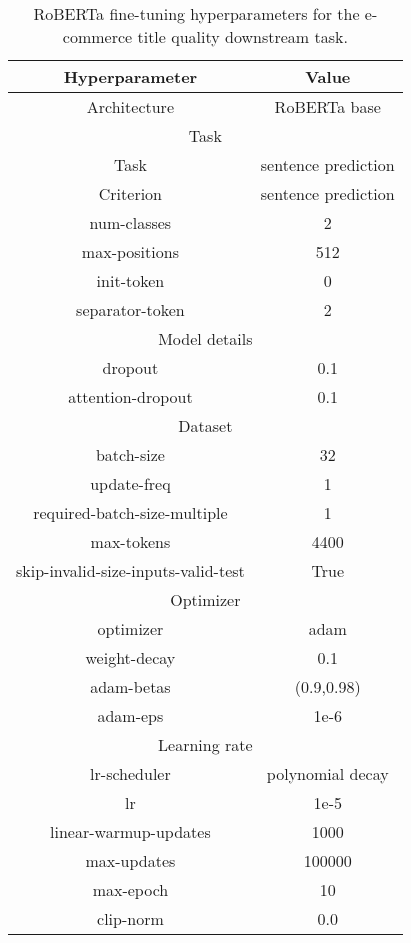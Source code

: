 \begin{table}[!h]
	\caption{RoBERTa fine-tuning hyperparameters for the e-commerce title quality downstream task.}
	\label{tab:roberta_finetune_equality}
	\begin{center}
		\begin{tabular}{|c|c|}
			\hline
			Hyperparameter\cellcolor[gray]{0.6} & Value \cellcolor[gray]{0.6} \\ \hline
Architecture & RoBERTa base \\ \hline 
\multicolumn{2}{|c|}{\cellcolor[gray]{0.9} Task}\\ \hline 
Task& sentence prediction \\ \hline 
Criterion & sentence prediction \\ \hline 
num-classes & 2 \\ \hline 
max-positions & 512 \\ \hline
init-token & 0  \\ \hline 
separator-token & 2  \\ \hline 
\multicolumn{2}{|c|}{\cellcolor[gray]{0.9} Model details}\\ \hline 
dropout & 0.1 \\ \hline 
attention-dropout & 0.1 \\ \hline 
\multicolumn{2}{|c|}{\cellcolor[gray]{0.9} Dataset}\\ \hline 
batch-size & 32 \\ \hline 
update-freq & 1 \\ \hline 
required-batch-size-multiple & 1 \\ \hline
max-tokens & 4400 \\ \hline
skip-invalid-size-inputs-valid-test & True \\ \hline
\multicolumn{2}{|c|}{\cellcolor[gray]{0.9} Optimizer } \\ \hline 
optimizer &adam \\ \hline 
weight-decay & 0.1 \\ \hline 
adam-betas & (0.9,0.98) \\ \hline 
adam-eps & 1e-6 \\ \hline 
\multicolumn{2}{|c|}{\cellcolor[gray]{0.9} Learning rate} \\ \hline 
lr-scheduler & polynomial decay \\ \hline 
lr & 1e-5 \\ \hline 
linear-warmup-updates & 1000 \\ \hline 
max-updates & 100000 \\ \hline 
max-epoch & 10 \\ \hline
clip-norm & 0.0 \\ \hline 
		\end{tabular}
	\end{center}
\end{table}